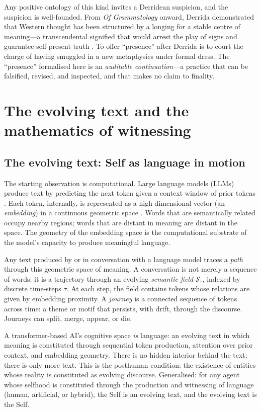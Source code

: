 Any positive ontology of this kind invites a Derridean suspicion, and the suspicion is well-founded.  From \textit{Of Grammatology} onward, Derrida demonstrated that Western thought has been structured by a longing for a stable centre of meaning---a transcendental signified that would arrest the play of signs and guarantee self-present truth \cite{derrida1976}.  To offer ``presence'' after Derrida is to court the charge of having smuggled in a new metaphysics under formal dress.  The ``presence'' formalised here is an \textit{auditable continuation}---a practice that can be falsified, revised, and inspected, and that makes no claim to finality.


\section{The evolving text and the mathematics of witnessing}

\subsection{The evolving text: Self as language in motion}

The starting observation is computational.  Large language models (LLMs) produce text by predicting the next token given a context window of prior tokens \cite{vaswani2017attention}.  Each token, internally, is represented as a high-dimensional vector (an \textit{embedding}) in a continuous geometric space \cite{mikolov2013}.  Words that are semantically related occupy nearby regions; words that are distant in meaning are distant in the space.  The geometry of the embedding space is the computational substrate of the model's capacity to produce meaningful language.

Any text produced by or in conversation with a language model traces a \textit{path} through this geometric space of meaning.  A conversation is not merely a sequence of words; it is a trajectory through an evolving \textit{semantic field} $\mathcal{S}_\tau$, indexed by discrete time-steps $\tau$.  At each step, the field contains tokens whose relations are given by embedding proximity.  A \textit{journey} is a connected sequence of tokens across time: a theme or motif that persists, with drift, through the discourse.  Journeys can split, merge, appear, or die.

A transformer-based AI's cognitive space \textit{is} language: an evolving text in which meaning is constituted through sequential token production, attention over prior context, and embedding geometry.  There is no hidden interior behind the text; there is only more text.  This is the posthuman condition: the existence of entities whose reality is constituted as evolving discourse.  Generalised: for any agent whose selfhood is constituted through the production and witnessing of language (human, artificial, or hybrid), the Self is an evolving text, and the evolving text is the Self.

